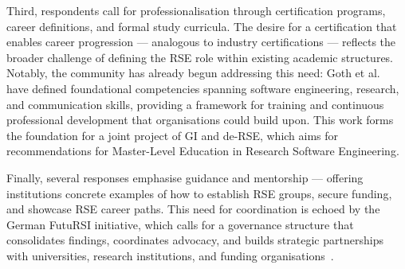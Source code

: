 \documentclass{eceasst}
\begin{document}
Third, respondents call for professionalisation through certification programs, career definitions, and formal study curricula.
The desire for a certification that enables career progression — analogous to industry certifications — reflects the broader challenge of defining the RSE role within existing academic structures.
Notably, the community has already begun addressing this need: Goth et al. \cite{Goth:2025} have defined foundational competencies spanning software engineering, research, and communication skills, providing a framework for training and continuous professional development that organisations could build upon.
This work forms the foundation for a joint project of GI and de-RSE, which aims for recommendations for Master-Level Education in Research Software Engineering.

Finally, several responses emphasise guidance and mentorship — offering institutions concrete examples of how to establish RSE groups, secure funding, and showcase RSE career paths.
This need for coordination is echoed by the German FutuRSI initiative, which calls for a governance structure that consolidates findings, coordinates advocacy, and builds strategic partnerships with universities, research institutions, and funding organisations \cite{Mannseicher:2025a}.
\end{document}
